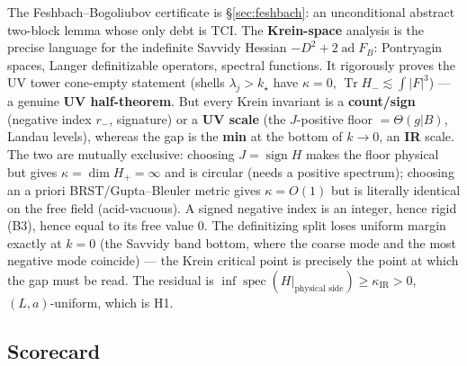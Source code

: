 The Feshbach--Bogoliubov certificate is \S\ref{sec:feshbach}: an unconditional abstract two-block
lemma whose only debt is TCI. The \textbf{Krein-space} analysis is the precise language for the
indefinite Savvidy Hessian $-D^2+2\operatorname{ad}F_B$: Pontryagin spaces, Langer definitizable
operators, spectral functions. It rigorously proves the UV tower cone-empty statement (shells
$\lambda_j>k_\star$ have $\kappa=0$, $\operatorname{Tr}H_-\lesssim\int|F|^3$) --- a genuine
\textbf{UV half-theorem}. But every Krein invariant is a \textbf{count/sign} (negative index
$r_-$, signature) or a \textbf{UV scale} (the $J$-positive floor $=\Theta(g|B)$, Landau levels),
whereas the gap is the \textbf{min} at the bottom of $k\to0$, an \textbf{IR} scale. The two are
mutually exclusive: choosing $J=\operatorname{sign}H$ makes the floor physical but gives
$\kappa=\dim H_+=\infty$ and is circular (needs a positive spectrum); choosing an a priori
BRST/Gupta--Bleuler metric gives $\kappa=O(1)$ but is literally identical on the free field
(acid-vacuous). A signed negative index is an integer, hence rigid (B3), hence equal to its free
value $0$. The definitizing split loses uniform margin exactly at $k=0$ (the Savvidy band bottom,
where the coarse mode and the most negative mode coincide) --- the Krein critical point is
precisely the point at which the gap must be read. The residual is
$\inf\operatorname{spec}(H|_{\text{physical side}})\ge\kappa_{\mathrm{IR}}>0$, $(L,a)$-uniform,
which is H1.

\subsection{Scorecard}

